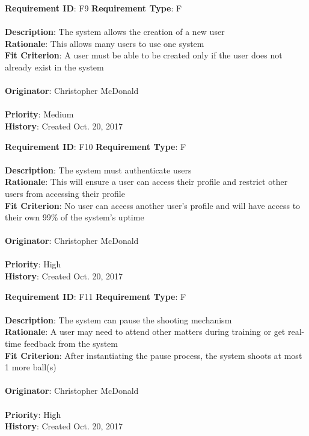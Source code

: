 \documentclass[11pt]{article}
\begin{document}
\begin{framed}
	\noindent\textbf{Requirement ID}: F9 \hfill \textbf{Requirement Type}: F \hfill\\\\
	\noindent\textbf{Description}: The system allows the creation of a new user \\
	\textbf{Rationale}: This allows many users to use one system \\
	\textbf{Fit Criterion}: A user must be able to be created only if the user does not already exist in the system \\\\
	\textbf{Originator}: Christopher McDonald \\\\
	\textbf{Priority}: Medium \hfill \\
	\noindent\textbf{History}: Created Oct. 20, 2017
\end{framed}

\begin{framed}
	\noindent\textbf{Requirement ID}: F10 \hfill \textbf{Requirement Type}: F \hfill\\\\
	\noindent\textbf{Description}: The system must authenticate users \\
	\textbf{Rationale}: This will ensure a user can access their profile and restrict other users from accessing their profile \\
	\textbf{Fit Criterion}: No user can access another user's profile and will have access to their own 99\% of the system's uptime \\\\
	\textbf{Originator}: Christopher McDonald \\\\
	\textbf{Priority}: High \hfill \\
	\noindent\textbf{History}: Created Oct. 20, 2017
\end{framed}

\begin{framed}
	\noindent\textbf{Requirement ID}: F11 \hfill \textbf{Requirement Type}: F \hfill\\\\
	\noindent\textbf{Description}: The system can pause the shooting mechanism \\
	\textbf{Rationale}: A user may need to attend other matters during training or get real-time feedback from the system \\
	\textbf{Fit Criterion}: After instantiating the pause process, the system shoots at most 1 more ball(s) \\\\
	\textbf{Originator}: Christopher McDonald \\\\
	\textbf{Priority}: High \hfill \\
	\noindent\textbf{History}: Created Oct. 20, 2017
\end{framed}
\end{document}
